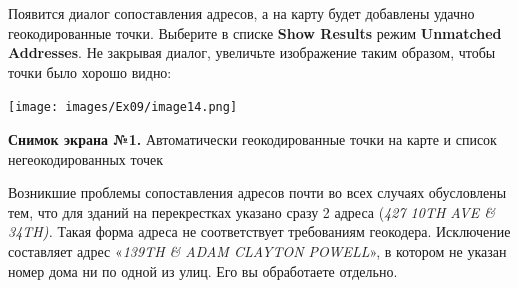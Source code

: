 \documentclass[12pt,]{book}
\begin{document}
\begin{enumerate}
  Появится диалог сопоставления адресов, а на карту будет добавлены удачно геокодированные точки. Выберите в списке \textbf{Show Results} режим \textbf{Unmatched Addresses}. Не закрывая диалог, увеличьте изображение таким образом, чтобы точки было хорошо видно:

  \texttt{[image: images/Ex09/image14.png]}

  \textbf{Снимок экрана №1.} Автоматически геокодированные точки на карте и список негеокодированных точек
\end{enumerate}

Возникшие проблемы сопоставления адресов почти во всех случаях обусловлены тем, что для зданий на перекрестках указано сразу 2 адреса (\emph{427 10TH AVE \& 34TH).} Такая форма адреса не соответствует требованиям геокодера. Исключение составляет адрес «\emph{139TH \& ADAM CLAYTON POWELL}», в котором не указан номер дома ни по одной из улиц. Его вы обработаете отдельно.
\end{document}
